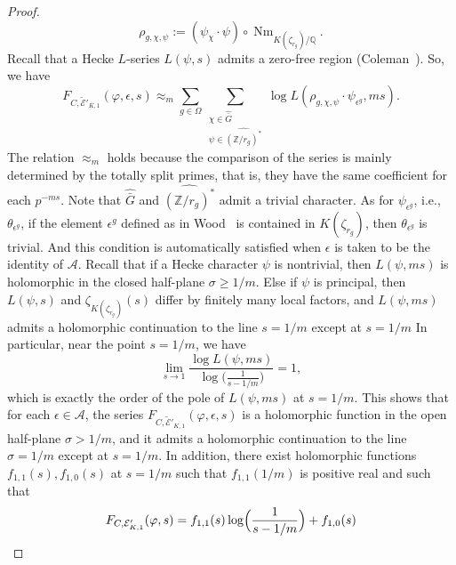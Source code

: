 \documentclass{amsart}
\numberwithin{equation}{section}
\theoremstyle{plain}
\theoremstyle{definition}
\theoremstyle{remark}
\begin{document}
\begin{proof}
    \begin{equation*}
        \rho_{g,\chi,\psi}:=(\psi_{\chi}\cdot\psi)\circ\operatorname{Nm}_{K(\zeta_{r_g})/\mathbb{Q}}.
    \end{equation*}
        Recall that a Hecke $L$-series $L(\psi,s)$ admits a zero-free region (Coleman~\cite{Coleman_1990}).
        So, we have 
    \begin{equation*}
      F_{C,\tilde{\mathcal{E}}'_{K,1}}(\varphi,\epsilon,s)
      \approx_m
      \sum_{g\in\Omega}
      \sum_{
      	\substack{
      		\chi\in\hat{\bar{G}}\\
      		\psi\in\widehat{(\mathbb{Z}/r_g)^*}
      		}
        }
        \log L(\rho_{g,\chi,\psi}\cdot\psi_{\epsilon^g},ms).
    \end{equation*}
    The relation $\approx_m$ holds because the comparison of the series is mainly determined by the totally split primes, that is, they have the same coefficient for each $p^{-ms}$.
    Note that $\widehat{\bar{G}}$ and $\widehat{(\mathbb{Z}/r_g)^*}$ admit a trivial character.
    As for $\psi_{\epsilon^g}$, i.e., $\theta_{\epsilon^g}$, if the element $\epsilon^g$ defined as in Wood~\cite[Lemma 2.17]{wood2010probabilities} is contained in $K(\zeta_{r_g})$, then $\theta_{\epsilon^g}$ is trivial.
    And this condition is automatically satisfied when $\epsilon$ is taken to be the identity of $\mathcal{A}$.
    Recall that if a Hecke character $\psi$ is nontrivial, then $L(\psi,ms)$ is holomorphic in the closed half-plane $\sigma\geq1/m$.
    Else if $\psi$ is principal, then $L(\psi,s)$ and $\zeta_{K(\zeta_{r_g})}(s)$ differ by finitely many local factors, and $L(\psi,ms)$ admits a holomorphic continuation to the line $s=1/m$ except at $s=1/m$
    In particular, near the point $s=1/m$, we have
    \begin{equation*}
        \lim_{s\to1}\frac{\log L(\psi,ms)}{\log\bigl(\frac{1}{s-1/m}\bigr)}=1,
    \end{equation*}
    which is exactly the order of the pole of $L(\psi,ms)$ at $s=1/m$.
	This shows that for each $\epsilon\in\mathcal{A}$, the series $F_{C,\tilde{\mathcal{E}}'_{K,1}}(\varphi,\epsilon,s)$ is a holomorphic function in the open half-plane $\sigma>1/m$,
    and it admits a holomorphic continuation to the line $\sigma=1/m$ except at $s=1/m$.
	In addition, there exist holomorphic functions $f_{1,1}(s),f_{1,0}(s)$ at $s=1/m$ such that $f_{1,1}(1/m)$ is positive real and such that
	\begin{equation*}
		F_{C,\mathcal{E}'_{K,1}}(\varphi,s)=f_{1,1}(s)\log\Bigl(\frac{1}{s-1/m}\Bigr)+f_{1,0}(s)

\end{equation*}
\end{proof}
\end{document}
